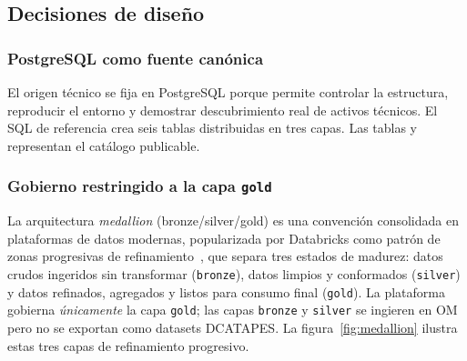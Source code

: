 
\subsection{Decisiones de diseño}

\subsubsection{PostgreSQL como fuente canónica}

El origen técnico se fija en PostgreSQL porque permite controlar la estructura, reproducir el entorno y demostrar descubrimiento real de activos técnicos. El SQL de referencia crea seis tablas distribuidas en tres capas. Las tablas  y  representan el catálogo publicable.

\subsubsection{Gobierno restringido a la capa \texttt{gold}}\label{sec:decision-gold-only}

La arquitectura \emph{medallion} (bronze/silver/gold) es una convención consolidada en plataformas de datos modernas, popularizada por Databricks como patrón de zonas progresivas de refinamiento~\cite{databricksMedallion}, que separa tres estados de madurez: datos crudos ingeridos sin transformar (\texttt{bronze}), datos limpios y conformados (\texttt{silver}) y datos refinados, agregados y listos para consumo final (\texttt{gold}). La plataforma gobierna \emph{únicamente} la capa \texttt{gold}; las capas \texttt{bronze} y \texttt{silver} se ingieren en \ac{OM} pero no se exportan como datasets \ac{DCATAPES}. La figura~\ref{fig:medallion} ilustra estas tres capas de refinamiento progresivo.


